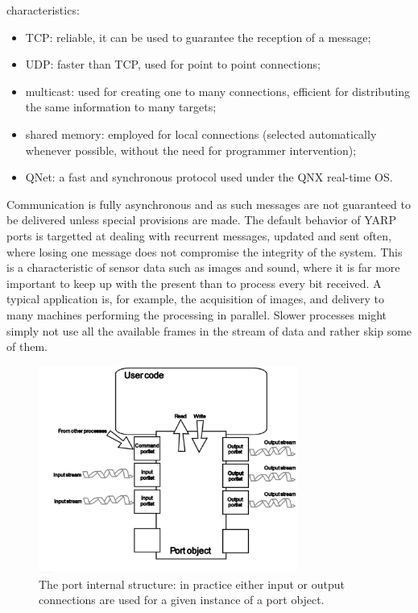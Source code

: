 characteristics:
\begin{itemize} \pflist
	\item TCP: reliable, it can be used to guarantee the reception of a message;
	\item UDP: faster than TCP, used for point to point connections;
	\item multicast: used for creating one to many connections, efficient for distributing
	the same information to many targets;
	\item shared memory: employed for local connections (selected automatically whenever possible, without the need for programmer intervention);
	\item QNet: a fast and synchronous protocol used under the QNX real-time OS.
\end{itemize}

Communication is fully asynchronous and as such messages are not guaranteed to be 
delivered unless special provisions are made. The default behavior of YARP ports 
is targetted at dealing with recurrent messages, updated and sent often, where losing 
one message does not compromise the integrity of the system. This is a characteristic
of sensor data such as images and sound, where it is far more important to keep
up with the present than to process every bit received.  
%
%
A typical application is, for example, the acquisition of images, and delivery to many 
machines performing the processing in parallel. Slower processes might simply not
use all the available frames in the stream of data and rather skip some of them.

\begin{figure}
	\centering
		\includegraphics[width=8.5cm]{port.eps}
	\caption{The port internal structure: in practice either input or output connections
	are used for a given instance of a port object.}
	\label{fig:port}
\end{figure}

